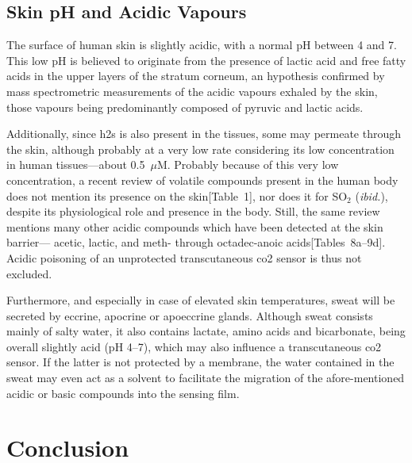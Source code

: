 \subsection{Skin pH and Acidic Vapours}\label{sect:tcco2:skin_mes:acid}

The surface of human skin is slightly acidic, with a normal pH between 4 and 7\cite{lambers2006}. This low pH is believed to originate from the presence of lactic acid and free fatty acids in the upper layers of the stratum corneum, an hypothesis confirmed by mass spectrometric measurements of the acidic vapours exhaled by the skin, those vapours being predominantly composed of pyruvic and lactic acids\cite{martinez2009}.

Additionally, since \gls{h2s} is also present in the tissues, some may permeate through the skin, although probably at a very low rate considering its low concentration in human tissues---about 0.5~$\mu$M\cite{stein2013}. Probably because of this very low concentration, a recent review of volatile compounds present in the human body does not mention its presence on the skin\cite{delacy2014}[Table~1], nor does it for SO$_2$ (\textit{ibid.}), despite its physiological role and presence in the body\cite{huang2015}. Still, the same review mentions many other acidic compounds which have been detected at the skin barrier---\eg{} acetic, lactic, and meth- through octadec-anoic acids\cite{delacy2014}[Tables~8a--9d]. Acidic poisoning of an unprotected transcutaneous \gls{co2} sensor is thus not excluded.

Furthermore, and especially in case of elevated skin temperatures, sweat will be secreted by eccrine, apocrine or apoeccrine glands. Although sweat consists mainly of salty water, it also contains lactate, amino acids and bicarbonate, being overall slightly acid (pH 4--7)\cite{baker2019}, which may also influence a transcutaneous \gls{co2} sensor. If the latter is not protected by a membrane, the water contained in the sweat may even act as a solvent to facilitate the migration of the afore-mentioned acidic or basic compounds into the sensing film.

\section{Conclusion}

